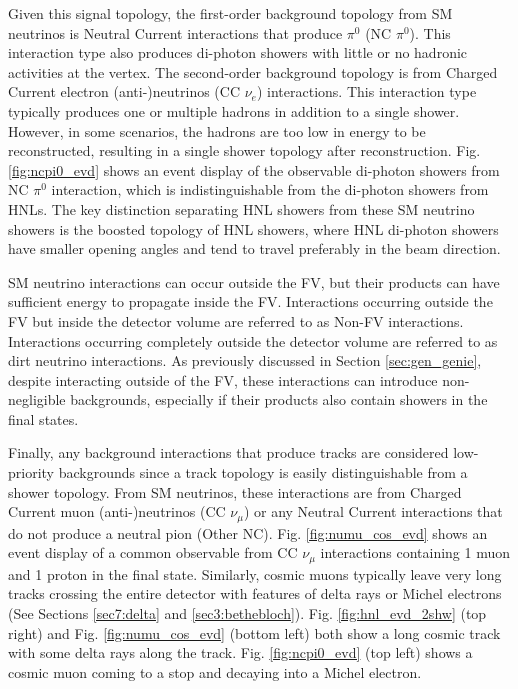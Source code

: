 Given this signal topology, the first-order background topology from SM neutrinos is Neutral Current interactions that produce $\pi^0$ (NC $\pi^0$).
This interaction type also produces di-photon showers with little or no hadronic activities at the vertex.
The second-order background topology is from Charged Current electron (anti-)neutrinos (CC $\nu_e$) interactions.
This interaction type typically produces one or multiple hadrons in addition to a single shower.
However, in some scenarios, the hadrons are too low in energy to be reconstructed, resulting in a single shower topology after reconstruction.
Fig. \ref{fig:ncpi0_evd} shows an event display of the observable di-photon showers from NC $\pi^0$ interaction, which is indistinguishable from the di-photon showers from HNLs.
The key distinction separating HNL showers from these SM neutrino showers is the boosted topology of HNL showers, where HNL di-photon showers have smaller opening angles and tend to travel preferably in the beam direction. 

SM neutrino interactions can occur outside the FV, but their products can have sufficient energy to propagate inside the FV.
Interactions occurring outside the FV but inside the detector volume are referred to as Non-FV interactions.
Interactions occurring completely outside the detector volume are referred to as dirt neutrino interactions.
As previously discussed in Section \ref{sec:gen_genie}, despite interacting outside of the FV, these interactions can introduce non-negligible backgrounds, especially if their products also contain showers in the final states. 

Finally, any background interactions that produce tracks are considered low-priority backgrounds since a track topology is easily distinguishable from a shower topology.
From SM neutrinos, these interactions are from Charged Current muon (anti-)neutrinos (CC $\nu_\mu$) or any Neutral Current interactions that do not produce a neutral pion (Other NC).
Fig. \ref{fig:numu_cos_evd} shows an event display of a common observable from CC $\nu_\mu$ interactions containing 1 muon and 1 proton in the final state.
Similarly, cosmic muons typically leave very long tracks crossing the entire detector with features of delta rays or Michel electrons (See Sections \ref{sec7:delta} and \ref{sec3:bethebloch}).
Fig. \ref{fig:hnl_evd_2shw} (top right) and Fig. \ref{fig:numu_cos_evd} (bottom left) both show a long cosmic track with some delta rays along the track.
Fig. \ref{fig:ncpi0_evd} (top left) shows a cosmic muon coming to a stop and decaying into a Michel electron.

